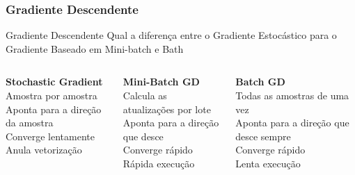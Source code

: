 \documentclass{beamer}
\begin{document}
\begin{frame}
	\frametitle{Gradiente Descendente}
	\begin{block}{Gradiente Descendente}
		Qual a diferença entre o Gradiente Estocástico para o Gradiente Baseado em Mini-batch e Bath \\
		\begin{columns}
			\begin{column}{0.3 \textwidth}
				\textbf{Stochastic Gradient} \\
				Amostra por amostra\\
				Aponta para a direção da amostra \\
				Converge lentamente \\
				Anula vetorização
			\end{column}
			\begin{column}{0.3 \textwidth}
				\textbf{Mini-Batch GD} \\
				Calcula as atualizações por lote \\
				Aponta para a direção que desce \\
				Converge rápido \\
				Rápida execução
			\end{column}
			\begin{column}{0.3 \textwidth}
				\textbf{Batch GD} \\
				Todas as amostras de uma vez \\
				Aponta para a direção que desce sempre \\
				Converge rápido \\
				Lenta execução
			\end{column}
		\end{columns}
		
	\end{block}
\end{frame}
\end{document}
